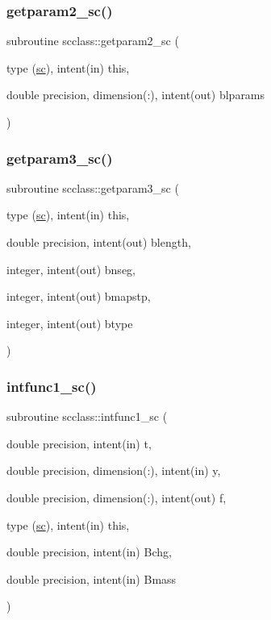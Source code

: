 \mbox{\label{namespacescclass_a036860e8ca9dff4cc79e19ec6c55f86a}} 
\subsubsection{\texorpdfstring{getparam2\_sc()}{getparam2\_sc()}}
{\footnotesize\ttfamily subroutine scclass\+::getparam2\+\_\+sc (\begin{DoxyParamCaption}\item[{type (\mbox{\hyperlink{namespacescclass_structscclass_1_1sc}{sc}}), intent(in)}]{this,  }\item[{double precision, dimension(\+:), intent(out)}]{blparams }\end{DoxyParamCaption})}

\mbox{\label{namespacescclass_aaa829fed79c7f89ac09b012687895817}} 
\subsubsection{\texorpdfstring{getparam3\_sc()}{getparam3\_sc()}}
{\footnotesize\ttfamily subroutine scclass\+::getparam3\+\_\+sc (\begin{DoxyParamCaption}\item[{type (\mbox{\hyperlink{namespacescclass_structscclass_1_1sc}{sc}}), intent(in)}]{this,  }\item[{double precision, intent(out)}]{blength,  }\item[{integer, intent(out)}]{bnseg,  }\item[{integer, intent(out)}]{bmapstp,  }\item[{integer, intent(out)}]{btype }\end{DoxyParamCaption})}

\mbox{\label{namespacescclass_a5d354b33de72df0b6be68290744f94ba}} 
\subsubsection{\texorpdfstring{intfunc1\_sc()}{intfunc1\_sc()}}
{\footnotesize\ttfamily subroutine scclass\+::intfunc1\+\_\+sc (\begin{DoxyParamCaption}\item[{double precision, intent(in)}]{t,  }\item[{double precision, dimension(\+:), intent(in)}]{y,  }\item[{double precision, dimension(\+:), intent(out)}]{f,  }\item[{type (\mbox{\hyperlink{namespacescclass_structscclass_1_1sc}{sc}}), intent(in)}]{this,  }\item[{double precision, intent(in)}]{Bchg,  }\item[{double precision, intent(in)}]{Bmass }\end{DoxyParamCaption})}

